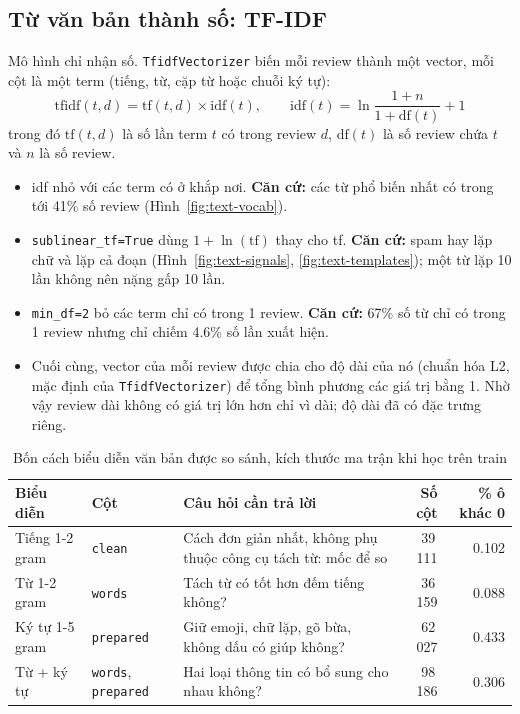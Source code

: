 \subsection{Từ văn bản thành số: TF-IDF}
\label{sec:text-tfidf}
Mô hình chỉ nhận số. \texttt{TfidfVectorizer} biến mỗi review thành một vector, mỗi cột là một term (tiếng, từ, cặp từ hoặc chuỗi ký tự):
\[
\text{tfidf}(t, d) = \text{tf}(t, d) \times \text{idf}(t), \qquad \text{idf}(t) = \ln\frac{1 + n}{1 + \text{df}(t)} + 1
\]
trong đó $\text{tf}(t, d)$ là số lần term $t$ có trong review $d$, $\text{df}(t)$ là số review chứa $t$ và $n$ là số review.
\begin{itemize}[leftmargin=1.5cm]
    \item idf nhỏ với các term có ở khắp nơi. \textbf{Căn cứ:} các từ phổ biến nhất có trong tới 41\% số review (Hình~\ref{fig:text-vocab}).
    \item \texttt{sublinear\_tf=True} dùng $1 + \ln(\text{tf})$ thay cho tf. \textbf{Căn cứ:} spam hay lặp chữ và lặp cả đoạn (Hình~\ref{fig:text-signals}, \ref{fig:text-templates}); một từ lặp 10 lần không nên nặng gấp 10 lần.
    \item \texttt{min\_df=2} bỏ các term chỉ có trong 1 review. \textbf{Căn cứ:} 67\% số từ chỉ có trong 1 review nhưng chỉ chiếm 4.6\% số lần xuất hiện.
    \item Cuối cùng, vector của mỗi review được chia cho độ dài của nó (chuẩn hóa L2, mặc định của \texttt{TfidfVectorizer}) để tổng bình phương các giá trị bằng 1.
          Nhờ vậy review dài không có giá trị lớn hơn chỉ vì dài; độ dài đã có đặc trưng riêng.
\end{itemize}

\begin{table}[H]
\centering
\caption{Bốn cách biểu diễn văn bản được so sánh, kích thước ma trận khi học trên train}
\label{tab:text-reprs}
\small
\begin{tabular}{l>{\raggedright\arraybackslash}p{2.4cm}>{\raggedright\arraybackslash}p{6.2cm}rr}
\toprule
Biểu diễn & Cột & Câu hỏi cần trả lời & Số cột & \% ô khác 0\\
\midrule
Tiếng 1-2 gram & \texttt{clean} & Cách đơn giản nhất, không phụ thuộc công cụ tách từ: mốc để so & 39\,111 & 0.102\\
Từ 1-2 gram & \texttt{words} & Tách từ có tốt hơn đếm tiếng không? & 36\,159 & 0.088\\
Ký tự 1-5 gram & \texttt{prepared} & Giữ emoji, chữ lặp, gõ bừa, không dấu có giúp không? & 62\,027 & 0.433\\
Từ + ký tự & \texttt{words}, \texttt{prepared} & Hai loại thông tin có bổ sung cho nhau không? & 98\,186 & 0.306\\
\bottomrule
\end{tabular}
\end{table}


